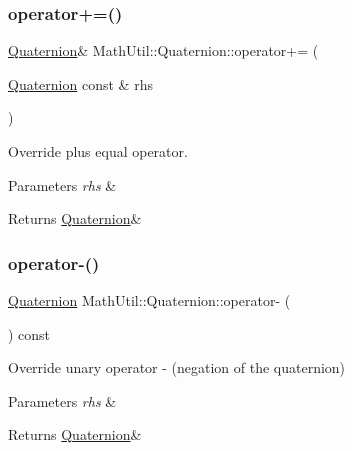 \subsubsection{\texorpdfstring{operator+=()}{operator+=()}}
{\footnotesize\ttfamily \hyperlink{structMathUtil_1_1Quaternion}{Quaternion}\& Math\+Util\+::\+Quaternion\+::operator+= (\begin{DoxyParamCaption}\item[{\hyperlink{structMathUtil_1_1Quaternion}{Quaternion} const \&}]{rhs }\end{DoxyParamCaption})\hspace{0.3cm}{\ttfamily [inline]}}



Override plus equal operator. 


\begin{DoxyParams}{Parameters}
{\em rhs} & \\
\hline
\end{DoxyParams}
\begin{DoxyReturn}{Returns}
\hyperlink{structMathUtil_1_1Quaternion}{Quaternion}\& 
\end{DoxyReturn}
\mbox{\label{structMathUtil_1_1Quaternion_a638a9680ea6bdb6fbd65d6ee5abd2708}} 
\subsubsection{\texorpdfstring{operator-\/()}{operator-()}}
{\footnotesize\ttfamily \hyperlink{structMathUtil_1_1Quaternion}{Quaternion} Math\+Util\+::\+Quaternion\+::operator-\/ (\begin{DoxyParamCaption}{ }\end{DoxyParamCaption}) const\hspace{0.3cm}{\ttfamily [inline]}}



Override unary operator -\/ (negation of the quaternion) 


\begin{DoxyParams}{Parameters}
{\em rhs} & \\
\hline
\end{DoxyParams}
\begin{DoxyReturn}{Returns}
\hyperlink{structMathUtil_1_1Quaternion}{Quaternion}\& 
\end{DoxyReturn}
\mbox{\label{structMathUtil_1_1Quaternion_a51b4197ad89c39f9a9e11cc25cc47331}} 
